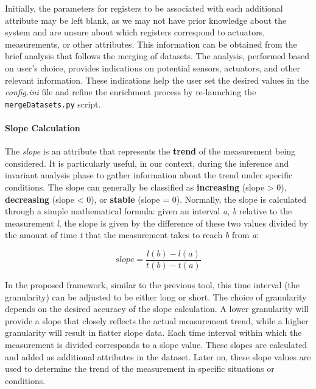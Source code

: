 Initially, the parameters for registers to be associated with each additional attribute may be left blank, as we may not have prior knowledge about the system and are unsure about which registers correspond to actuators, measurements, or other attributes. This information can be obtained from the brief analysis that follows the merging of datasets. The analysis, performed based on user's choice, provides indications on potential sensors, actuators, and other relevant information. These indications help the user set the desired values in the \textit{config.ini} file and refine the enrichment process by re-launching the \texttt{mergeDatasets.py} script.

\paragraph{Slope Calculation}
\label{par:4_slope_calculation}
The \textit{slope} is an attribute that represents the \textbf{trend} of the measurement being considered. It is particularly useful, in our context, during the inference and invariant analysis phase to gather information about the trend under specific conditions. The slope can generally be classified as \textbf{increasing} (slope > 0), \textbf{decreasing} (slope < 0), or \textbf{stable} (slope = 0).\newline
Normally, the slope is calculated through a simple mathematical formula: given an interval \textit{a}, \textit{b} relative to the measurement \textit{l}, the slope is given by the difference of these two values divided by the amount of time \textit{t} that the measurement takes to reach \textit{b} from \textit{a}:

\[slope = \frac{l(b) -l(a)}{t(b) - t(a)}\]

In the proposed framework, similar to the previous tool, this time interval (the granularity) can be adjusted to be either long or short. The choice of granularity depends on the desired accuracy of the slope calculation. A lower granularity will provide a slope that closely reflects the actual measurement trend, while a higher granularity will result in flatter slope data. Each time interval within which the measurement is divided corresponds to a slope value. These slopes are calculated and added as additional attributes in the dataset. Later on, these slope values are used to determine the trend of the measurement in specific situations or conditions.

